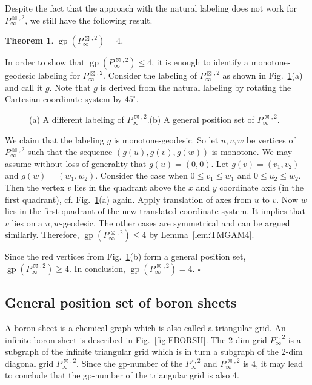 \documentclass[12pt]{article}
\newtheorem{theorem}{Theorem}[section]
\newcommand{\proof}{\noindent{\bf Proof.\ }}
\newcommand{\qed}{\hfill $\square$\medskip}
\def\cp{\,\square\,}
\def\sp{\,\boxtimes\,}
\DeclareMathOperator {\gp} {gp}
\begin{document}
Despite the fact that the approach with the natural labeling does not work for $P_{\infty}^{\sp,2}$, we still have the following result. 

\begin{theorem}
\label{thm:TGP4IDGR}
$\gp(P_{\infty}^{\sp,2}) = 4$.
\end{theorem}

\proof 
In order to show that $\gp(P_{\infty}^{\sp,2}) \le 4$, it is enough to identify a monotone-geodesic labeling for $P_{\infty}^{\sp,2}$. Consider the labeling of $P_{\infty}^{\sp,2}$ as shown in Fig.~\ref{fig:FIDGR2}(a) and call it $g$. Note that $g$ is derived from the natural labeling by rotating the Cartesian coordinate system by $45^{\circ}$.

\begin{figure}[ht!]
	\begin{center}
	\end{center}
	\caption{(a) A different labeling of $P_{\infty}^{\sp,2}$.(b) A general position set of $P_{\infty}^{\sp,2}$.}
	\label{fig:FIDGR2}
\end{figure}

We claim that the labeling $g$ is monotone-geodesic. So let $u,v,w$ be vertices of $P_{\infty}^{\sp,2}$ such that the sequence $(g(u), g(v), g(w))$ is monotone. We may assume without loss of generality that $g(u) = (0,0)$. Let $g(v) = (v_1, v_2)$ and  $g(w) = (w_1, w_2)$. Consider the case when $0\le v_1\le w_1$ and $0\le u_2\le w_2$. Then the vertex $v$ lies in the quadrant above the $x$ and $y$ coordinate axis (in the first quadrant), cf. Fig.~\ref{fig:FIDGR2}(a) again. Apply translation of axes from $u$ to $v$. Now $w$ lies in the first quadrant of the new translated coordinate system. It implies that $v$ lies on a $u,w$-geodesic. The other cases are symmetrical and can be argued similarly. Therefore, $\gp(P_{\infty}^{\sp,2}) \le 4$ by Lemma~\ref{lem:TMGAM4}. 

Since the red vertices from Fig.~\ref{fig:FIDGR2}(b) form a general position set, $\gp(P_{\infty}^{\sp,2}) \geq 4$. In conclusion, $\gp(P_{\infty}^{\sp,2}) = 4$.
\qed

\subsection{General position set of boron sheets}
\label{subsec:boron}

A boron sheet is a chemical graph which is also called a triangular grid. An infinite boron sheet is described in Fig.~\ref{fig:FBORSH}. The 2-dim grid  $P_{\infty}^{\cp,2}$ is a subgraph of the infinite triangular grid which is in turn a subgraph of the 2-dim diagonal grid $P_{\infty}^{\sp,2}$. Since the gp-number of the $P_{\infty}^{\cp,2}$ and $P_{\infty}^{\sp,2}$ is 4, it may lead to conclude that the gp-number of the triangular grid is also 4.
\end{document}
